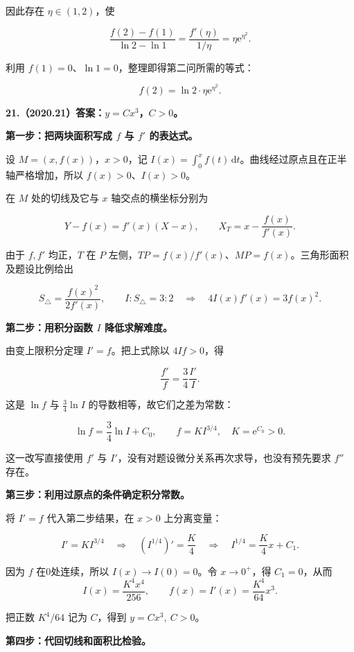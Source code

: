 \documentclass[UTF8,11pt,fontset=windows]{ctexart}
\begin{document}
因此存在 $\eta\in(1,2)$，使

$$
\frac{f(2)-f(1)}{\ln2-\ln1}
=\frac{f'(\eta)}{1/\eta}
=\eta\mathrm e^{\eta^2}.
$$

利用 $f(1)=0$、$\ln1=0$，整理即得第二问所需的等式：

$$
\boxed{f(2)=\ln2\cdot\eta\mathrm e^{\eta^2}}.
$$

\clearpage

\textbf{21.（2020.21）答案：$y=Cx^3$，$C>0$。}

\textbf{第一步：把两块面积写成 $f$ 与 $f'$ 的表达式。}

设 $M=(x,f(x))$，$x>0$，记 $I(x)=\int_0^x f(t)\,\mathrm dt$。曲线经过原点且在正半轴严格增加，所以 $f(x)>0$、$I(x)>0$。

在 $M$ 处的切线及它与 $x$ 轴交点的横坐标分别为

$$
Y-f(x)=f'(x)(X-x),
\qquad X_T=x-\frac{f(x)}{f'(x)}.
$$

由于 $f,f'$ 均正，$T$ 在 $P$ 左侧，$TP=f(x)/f'(x)$、$MP=f(x)$。三角形面积及题设比例给出

$$
S_{\triangle}=\frac{f(x)^2}{2f'(x)},
\qquad I:S_{\triangle}=3:2
\quad\Longrightarrow\quad 4I(x)f'(x)=3f(x)^2.
$$

\textbf{第二步：用积分函数 $I$ 降低求解难度。}

由变上限积分定理 $I'=f$。把上式除以 $4If>0$，得

$$
\frac{f'}f=\frac34\frac{I'}I.
$$

这是 $\ln f$ 与 $\tfrac34\ln I$ 的导数相等，故它们之差为常数：

$$
\ln f=\frac34\ln I+C_0,
\qquad f=K I^{3/4},\quad K=\mathrm e^{C_0}>0.
$$

这一改写直接使用 $f'$ 与 $I'$，没有对题设微分关系再次求导，也没有预先要求 $f''$ 存在。

\textbf{第三步：利用过原点的条件确定积分常数。}

将 $I'=f$ 代入第二步结果，在 $x>0$ 上分离变量：

$$
I'=K I^{3/4}
\quad\Longrightarrow\quad
\left(I^{1/4}\right)'=\frac K4
\quad\Longrightarrow\quad I^{1/4}=\frac K4x+C_1.
$$

因为 $f$ 在0处连续，所以 $I(x)\to I(0)=0$。令 $x\to0^+$，得 $C_1=0$，从而
$$
I(x)=\frac{K^4x^4}{256},
\qquad f(x)=I'(x)=\frac{K^4}{64}x^3.
$$

把正数 $K^4/64$ 记为 $C$，得到 $\boxed{y=Cx^3,\ C>0}$。

\textbf{第四步：代回切线和面积比检验。}
\end{document}
